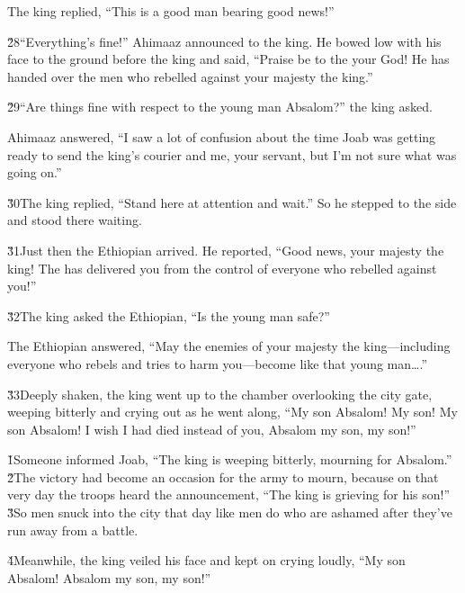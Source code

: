 The king replied, ``This is a good man bearing good news!''

\v{28}``Everything's fine!'' Ahimaaz announced to the king. He bowed low with his face to the ground before the king and said, ``Praise be to the  your God! He has handed over the men who rebelled against your majesty the king.''

\v{29}``Are things fine with respect to the young man Absalom?'' the king asked.

Ahimaaz answered, ``I saw a lot of confusion about the time Joab was getting ready to send the king's courier and me, your servant, but I'm not sure what was going on.''

\v{30}The king replied, ``Stand here at attention and wait.'' So he stepped to the side and stood there waiting.

\v{31}Just then the Ethiopian arrived. He reported, ``Good news, your majesty the king! The  has delivered you from the control of everyone who rebelled against you!''

\v{32}The king asked the Ethiopian, ``Is the young man safe?''

The Ethiopian answered, ``May the enemies of your majesty the king---including everyone who rebels and tries to harm you---become like that young man{\ldots}.''

\v{33}Deeply shaken, the king went up to the chamber overlooking the city gate, weeping bitterly and crying out as he went along, ``My son Absalom! My son! My son Absalom! I wish I had died instead of you, Absalom my son, my son!''

\v{1}Someone informed Joab, ``The king is weeping bitterly, mourning for Absalom.'' \v{2}The victory had become an occasion for the army to mourn, because on that very day the troops heard the announcement, ``The king is grieving for his son!'' \v{3}So men snuck into the city that day like men do who are ashamed after they've run away from a battle.

\v{4}Meanwhile, the king veiled his face and kept on crying loudly, ``My son Absalom! Absalom my son, my son!''

